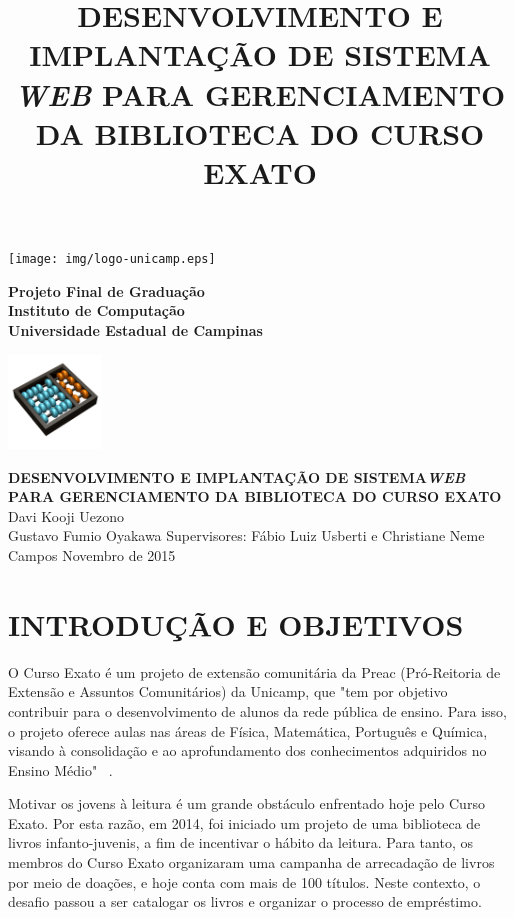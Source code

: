 \documentclass[a4paper]{article}
\title{DESENVOLVIMENTO E IMPLANTAÇÃO DE SISTEMA \textit{WEB} PARA GERENCIAMENTO DA BIBLIOTECA DO CURSO EXATO}
\begin{document}
\begin{minipage}[t|]{14mm}
\texttt{[image: img/logo-unicamp.eps]}
\end{minipage}
\hfill
\begin{minipage}[tl]{120mm}
\begin{center}
{\bf \sc Projeto Final de Graduação}\\
{\bf \sc Instituto de Computação} \\
{\bf \sc Universidade Estadual de Campinas} \\
\end{center}
\end{minipage}
\hfill
\begin{minipage}[c]{25mm}
\hspace{-0.5cm}
\includegraphics[width=25mm]{img/logo-ic.png}
\end{minipage}
\vfill\vfill
\begin{center}
\Huge{\textbf{DESENVOLVIMENTO E IMPLANTAÇÃO DE SISTEMA\textit{WEB} PARA GERENCIAMENTO DA BIBLIOTECA DO CURSO EXATO}}
\vfill\vfill
\huge{Davi Kooji Uezono\\Gustavo Fumio Oyakawa}
\vfill
\Large{Supervisores: Fábio Luiz Usberti e Christiane Neme Campos}
\vfill\vfill
\Large{Novembro de 2015}
\end{center}
\vfill


\pagebreak
\section{INTRODUÇÃO E OBJETIVOS}

O Curso Exato é um projeto de extensão comunitária da Preac (Pró-Reitoria de Extensão e Assuntos Comunitários) da Unicamp, que "tem por objetivo contribuir para o desenvolvimento de alunos da rede pública de ensino. Para isso, o projeto oferece aulas nas áreas de Física, Matemática, Português e Química, visando à consolidação e ao aprofundamento dos conhecimentos adquiridos no Ensino Médio" \ \cite{cursoexato}.

Motivar os jovens à leitura é um grande obstáculo enfrentado hoje pelo Curso Exato. Por esta razão, em 2014, foi iniciado um projeto de uma biblioteca de livros infanto-juvenis, a fim de incentivar o hábito da leitura. Para tanto, os membros do Curso Exato organizaram uma campanha de arrecadação de livros por meio de doações, e hoje conta com mais de 100 títulos. Neste contexto, o desafio passou a ser catalogar os livros e organizar o processo de empréstimo.
\end{document}
